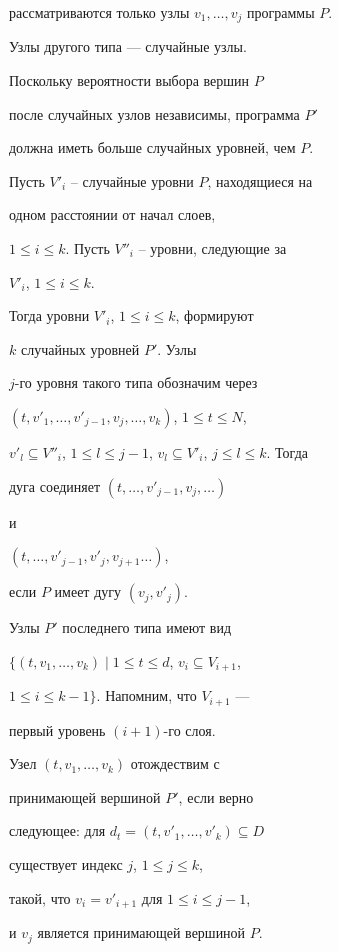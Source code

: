 \begin{pf}
рассматриваются только узлы $v_1,\dotsc,v_j$ программы $P$.





Узлы другого типа --- случайные узлы.


Поскольку вероятности выбора вершин $P$


после случайных узлов независимы, программа $P'$


должна иметь больше случайных уровней, чем $P$.


Пусть $V'_i$ -- случайные уровни $P$, находящиеся на


одном расстоянии от начал слоев,


$1\leq i\leq k$. Пусть $V''_i$ -- уровни, следующие за


$V'_i$, $1\leq i\leq k$.


Тогда уровни $V'_i$, $1\leq i\leq k$, формируют


$k$ случайных уровней $P'$. Узлы


$j$-го уровня такого типа обозначим через


$(t,v'_1,\dotsc,v'_{j-1},v_j,\dotsc,v_k)$, $1\leq t\leq N$,


$v'_l\subseteq V''_i$, $1\leq l\leq j-1$, $v_l


\subseteq V'_i$, $j\leq l\leq k$. Тогда


дуга соединяет $(t,\dotsc,v'_{j-1},v_j,\dotsc)$


и


$(t,\dotsc,v'_{j-1},v'_j,v_{j+1}\dotsc)$,


если $P$ имеет дугу $(v_j,v'_j)$.





Узлы $P'$ последнего типа имеют вид


$\{(t,v_1,\dotsc,v_k)\mid 1\leq t\leq d$, $v_i\subseteq V_{i+1}$,


$1\leq i \leq k-1\}$. Напомним, что $V_{i+1}$ ---


первый уровень $(i+1)$-го слоя.


Узел $(t,v_1,\dotsc,v_k)$ отождествим с


при\-ни\-ма\-ющей вершиной $P'$, если верно


следующее: для $d_t=(t,v'_1,\dotsc,v'_k)\subseteq D$


существует индекс $j$, $1\leq j\leq k$,


такой, что $v_i=v'_{i+1}$ для $1\leq i\leq j-1$,


и $v_j$ является принимающей вершиной $P$.



\end{pf}
